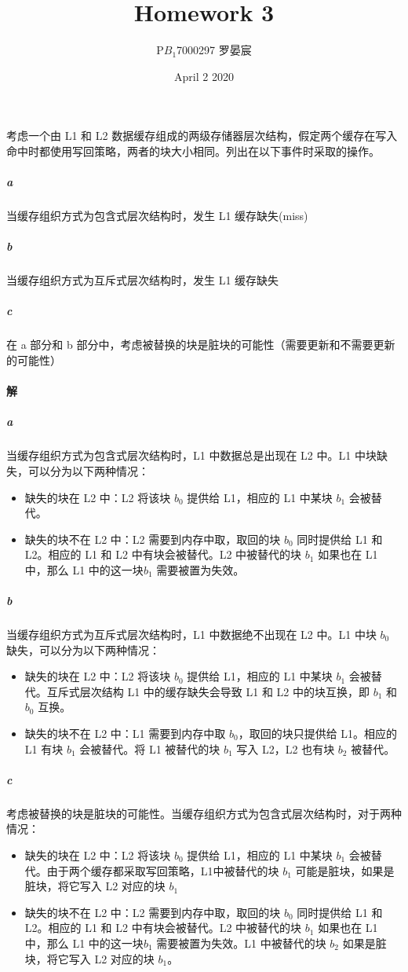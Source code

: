 \documentclass{article}
\title{Homework 3}
\author{P$B_1$7000297 罗晏宸}
\date{April 2 2020}
\begin{document}
\maketitle

\section{}
考虑一个由 L1 和 L2 数据缓存组成的两级存储器层次结构，假定两个缓存在写入命中时都使用写回策略，两者的块大小相同。列出在以下事件时采取的操作。
\subparagraph{a} 当缓存组织方式为包含式层次结构时，发生 L1 缓存缺失(miss)
\subparagraph{b} 当缓存组织方式为互斥式层次结构时，发生 L1 缓存缺失
\subparagraph{c} 在 a 部分和 b 部分中，考虑被替换的块是脏块的可能性（需要更新和不需要更新的可能性）

\paragraph{解}
\subparagraph{a}
当缓存组织方式为包含式层次结构时，L1 中数据总是出现在 L2 中。L1 中块缺失，可以分为以下两种情况：
\begin{itemize}
    \item 缺失的块在 L2 中：L2 将该块 $b_0$ 提供给 L1，相应的 L1 中某块 $b_1$ 会被替代。
    \item 缺失的块不在 L2 中：L2 需要到内存中取，取回的块 $b_0$ 同时提供给 L1 和 L2。相应的 L1 和 L2 中有块会被替代。L2 中被替代的块 $b_1$ 如果也在 L1 中，那么 L1 中的这一块$b_1$ 需要被置为失效。
\end{itemize}

\subparagraph{b}
当缓存组织方式为互斥式层次结构时，L1 中数据绝不出现在 L2 中。L1 中块 $b_0$ 缺失，可以分为以下两种情况：
\begin{itemize}
    \item 缺失的块在 L2 中：L2 将该块 $b_0$ 提供给 L1，相应的 L1 中某块 $b_1$ 会被替代。互斥式层次结构 L1 中的缓存缺失会导致 L1 和 L2 中的块互换，即 $b_1$ 和 $b_0$ 互换。
    \item 缺失的块不在 L2 中：L1 需要到内存中取 $b_0$，取回的块只提供给 L1。相应的 L1 有块 $b_1$ 会被替代。将 L1 被替代的块 $b_1$ 写入 L2，L2 也有块 $b_2$ 被替代。
\end{itemize}

\subparagraph{c}
考虑被替换的块是脏块的可能性。当缓存组织方式为包含式层次结构时，对于两种情况：
\begin{itemize}
    \item 缺失的块在 L2 中：L2 将该块 $b_0$ 提供给 L1，相应的 L1 中某块 $b_1$ 会被替代。由于两个缓存都采取写回策略，L1中被替代的块 $b_1$ 可能是脏块，如果是脏块，将它写入 L2 对应的块 $b_1$
    \item 缺失的块不在 L2 中：L2 需要到内存中取，取回的块 $b_0$ 同时提供给 L1 和 L2。相应的 L1 和 L2 中有块会被替代。L2 中被替代的块 $b_1$ 如果也在 L1 中，那么 L1 中的这一块$b_1$ 需要被置为失效。L1 中被替代的块 $b_2$ 如果是脏块，将它写入 L2 对应的块 $b_1$。
\end{itemize}
\end{document}
